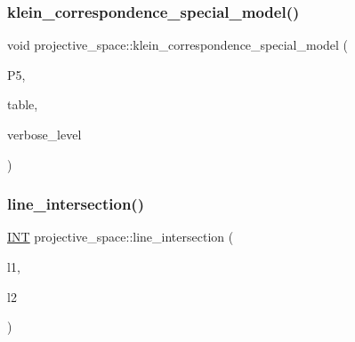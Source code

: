 \mbox{\label{classprojective__space_a0460ef9dd2799f85fee962d142d20eea}} 
\subsubsection{\texorpdfstring{klein\+\_\+correspondence\+\_\+special\+\_\+model()}{klein\_correspondence\_special\_model()}}
{\footnotesize\ttfamily void projective\+\_\+space\+::klein\+\_\+correspondence\+\_\+special\+\_\+model (\begin{DoxyParamCaption}\item[{\mbox{\hyperlink{classprojective__space}{projective\+\_\+space}} $\ast$}]{P5,  }\item[{\mbox{\hyperlink{galois_8h_a09fddde158a3a20bd2dcadb609de11dc}{I\+NT}} $\ast$}]{table,  }\item[{\mbox{\hyperlink{galois_8h_a09fddde158a3a20bd2dcadb609de11dc}{I\+NT}}}]{verbose\+\_\+level }\end{DoxyParamCaption})}

\mbox{\label{classprojective__space_addb4eb5baf4a1396e1b3f490bc5e7b9b}} 
\subsubsection{\texorpdfstring{line\+\_\+intersection()}{line\_intersection()}}
{\footnotesize\ttfamily \mbox{\hyperlink{galois_8h_a09fddde158a3a20bd2dcadb609de11dc}{I\+NT}} projective\+\_\+space\+::line\+\_\+intersection (\begin{DoxyParamCaption}\item[{\mbox{\hyperlink{galois_8h_a09fddde158a3a20bd2dcadb609de11dc}{I\+NT}}}]{l1,  }\item[{\mbox{\hyperlink{galois_8h_a09fddde158a3a20bd2dcadb609de11dc}{I\+NT}}}]{l2 }\end{DoxyParamCaption})}

\mbox{\label{classprojective__space_af35b6d402c45793a77b8ebc9e7c3985e}} 

